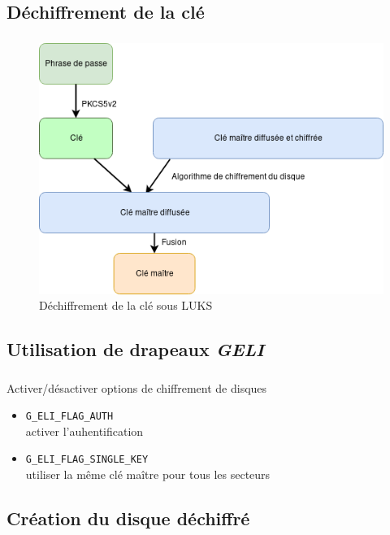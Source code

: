 \subsection{Déchiffrement de la clé}

\begin{frame}
	\frametitle{\insertsubsectionhead{}}
	\begin{figure}
		\includegraphics[width=.7\textwidth]{developpement/dechiffrement_cle}
		\caption{Déchiffrement de la clé sous LUKS}
	\end{figure}
\end{frame}

\subsection{Utilisation de drapeaux \textit{GELI}}

\begin{frame}
  \frametitle{\insertsubsectionhead{}}
  \begin{block}{Activer/désactiver options de chiffrement de disques}
    \begin{itemize}
    \item \texttt{G\_ELI\_FLAG\_AUTH} \\
      \textrightarrow{} activer l'auhentification
    \item \texttt{G\_ELI\_FLAG\_SINGLE\_KEY} \\
      \textrightarrow{} utiliser la même clé maître pour tous les secteurs
    \end{itemize}
  \end{block}
\end{frame}

\subsection{Création du disque déchiffré}

